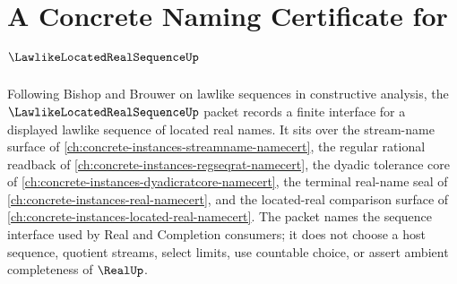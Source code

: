 \chapter{A Concrete Naming Certificate for $\LawlikeLocatedRealSequenceUp$}
\label{ch:concrete-instances-lawlike-located-real-sequence-namecert}

Following Bishop and Brouwer on lawlike sequences in constructive analysis, the $\LawlikeLocatedRealSequenceUp$ packet records a finite interface for a displayed lawlike sequence of located real names. It sits over the stream-name surface of \autoref{ch:concrete-instances-streamname-namecert}, the regular rational readback of \autoref{ch:concrete-instances-regseqrat-namecert}, the dyadic tolerance core of \autoref{ch:concrete-instances-dyadicratcore-namecert}, the terminal real-name seal of \autoref{ch:concrete-instances-real-namecert}, and the located-real comparison surface of \autoref{ch:concrete-instances-located-real-namecert}. The packet names the sequence interface used by Real and Completion consumers; it does not choose a host sequence, quotient streams, select limits, use countable choice, or assert ambient completeness of $\RealUp$.

